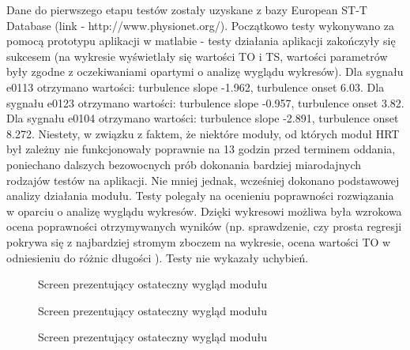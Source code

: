 \documentclass[a4paper, 11pt]{article}
\begin{document}
Dane do pierwszego etapu testów zostały uzyskane z bazy European ST-T Database (link - http://www.physionet.org/).
Początkowo testy wykonywano za pomocą prototypu aplikacji w matlabie - testy działania aplikacji zakończyły się sukcesem 
(na wykresie wyświetlały się wartości TO i TS, wartości parametrów były zgodne z oczekiwaniami opartymi o analizę
wyglądu wykresów). 
Dla sygnału e0113 otrzymano wartości: turbulence slope -1.962, turbulence onset 6.03.
Dla sygnału e0123 otrzymano wartości: turbulence slope -0.957, turbulence onset 3.82.
Dla sygnału e0104 otrzymano wartości: turbulence slope -2.891, turbulence onset 8.272.
Niestety, w związku z faktem, że niektóre moduły, od których moduł HRT był zależny nie funkcjonowały
poprawnie na 13 godzin przed terminem oddania, poniechano dalszych bezowocnych prób dokonania bardziej miarodajnych
rodzajów testów na aplikacji. Nie mniej jednak, wcześniej dokonano podstawowej analizy działania modułu.
Testy polegały na ocenieniu poprawności rozwiązania w oparciu o analizę wyglądu wykresów. Dzięki wykresowi możliwa była
wzrokowa ocena poprawności otrzymywanych wyników (np. sprawdzenie, czy prosta regresji pokrywa się z najbardziej stromym zboczem
na wykresie, ocena wartości TO w odniesieniu do różnic długości ). Testy nie wykazały uchybień. 
\begin{figure}[h!]
\centering
\caption{Screen prezentujący ostateczny wygląd modułu} 
\end{figure}

\begin{figure}[h!]
\centering
\caption{Screen prezentujący ostateczny wygląd modułu} 
\end{figure}

\begin{figure}[h!]
\centering
\caption{Screen prezentujący ostateczny wygląd modułu} 
\end{figure}



\end{document}
